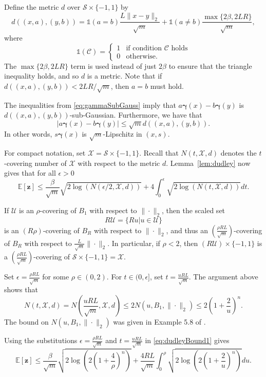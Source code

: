 \documentclass[twoside]{article}
\theoremstyle{definition}
\newcommand{\E}{\mathbb{E}}
\newcommand{\cS}{\mathcal{S}}
\newcommand{\cU}{\mathcal{U}}
\newcommand{\cX}{\mathcal{X}}
\newcommand{\indic}{\mathds{1}}
\newcommand{\1}[1]{\scalebox{1.25}{$\mathds{1}$}\left[#1\right]}
\begin{document}
Define the metric $d$ over $\cS\times \{-1,1\}$ by
$$
d((x,a),(y,b))=\indic(a=b)\frac{L\|x-y\|_2}{\sqrt{m}}+\indic(a\ne b)\frac{\max\{2\beta,2LR\}}{\sqrt{m}},
$$
where 
$$
\indic(\mathcal{C})=\begin{cases}
1 & \textrm{if condition } \mathcal{C} \textrm{ holds}\\
0 & \textrm{otherwise}.
\end{cases}
$$
The $\max\{2\beta,2LR\}$ term is used instead of just $2\beta$ to ensure that the triangle inequality holds, and so $d$ is a metric. Note that if $d((x,a),(y,b))< 2LR/\sqrt{m}$, then $a=b$ must hold. 


The inequalities from \eqref{eq:gammaSubGauss} imply that $
a\bm{\gamma}(x)-b\bm{\gamma}(y)
$ is $d((x,a),(y,b))$-sub-Gaussian. Furthermore, we have that
$$
|a\bm{\gamma}(x)-b\bm{\gamma}(y)|\le \sqrt{m}d((x,a),(y,b)).
$$
In other words, $s\bm{\gamma}(x)$ is $\sqrt{m}$-Lipschitz in $(x,s)$. 

For compact notation, set $\cX=\cS\times \{-1,1\}$. Recall that $N(t,\cX,d)$ denotes the $t$-covering number of $\cX$ with respect to the metric $d$. Lemma~\ref{lem:dudley} now gives that for all $\epsilon >0$
\begin{equation}
\label{eq:dudleyBound1}
\E[\bm{z}]\le \frac{\beta}{\sqrt{m}}\sqrt{2\log(N(\epsilon/2,\cX,d))}
+4\int_{0}^{\epsilon}\sqrt{2\log(N(t,\cX,d))}dt.
\end{equation}

If $\cU$ is an $\rho$-covering of $B_1$ with respect to $\|\cdot\|_2$, then the scaled set 
$$
R\cU=\{Ru|u\in\cU\}
$$
is an $(R\rho)$-covering of $B_R$ with respect to $\|\cdot\|_2$, and thus an $\left(\frac{\rho RL}{\sqrt{m}}\right)$-covering of $B_R$ with respect to $\frac{L}{\sqrt{m}}\|\cdot\|_2$. In particular, if $\rho < 2$, then $(R\cU)\times \{-1,1\}$ is a $\left(\frac{\rho RL}{\sqrt{m}}\right)$-covering of $\cS\times \{-1,1\}=\cX$.

Set $\epsilon=\frac{\rho RL}{\sqrt{m}}$ for some $\rho \in (0,2)$. For $t\in (0,\epsilon]$, set $t=\frac{u RL}{\sqrt{m}}$. The argument above shows that
$$
N(t,\cX,d)=N\left(\frac{u RL}{\sqrt{m}},\cX,d \right)\le 2N(u,B_1,\|\cdot\|_2)\le 2\left(1+\frac{2}{u}\right)^n.
$$
The bound on $N(u,B_1,\|\cdot\|_2)$ was given in Example 5.8 of \cite{wainwright2019high}.

Using the substitutions $\epsilon=\frac{\rho RL}{\sqrt{m}}$ and $t=\frac{u RL}{\sqrt{m}}$ in \eqref{eq:dudleyBound1} gives
\begin{equation}
\label{eq:dudleySub}
\E[\bm{z}]\le \frac{\beta}{\sqrt{m}}\sqrt{2\log\left(2\left(1+\frac{4}{\rho}\right)^n\right)}
+\frac{4RL}{\sqrt{m}}\int_0^{\rho}\sqrt{2\log\left(2\left(1+\frac{2}{u}\right)^n\right)}du.
\end{equation}
\end{document}
